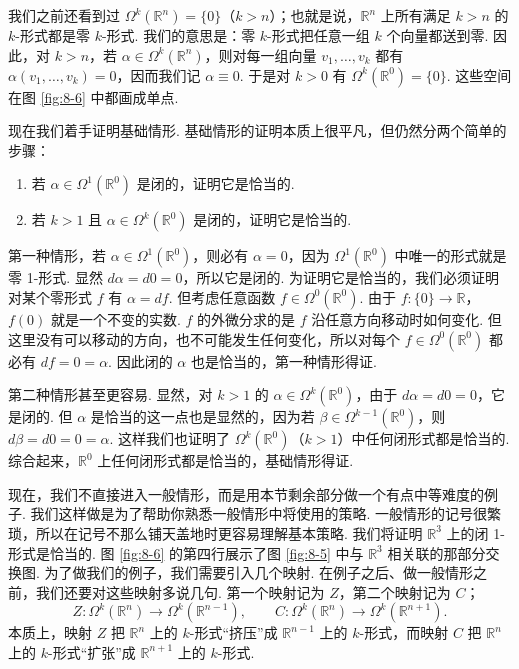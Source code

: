 我们之前还看到过 $\Omega^k(\mathbb{R}^n)=\{0\}$（$k>n$）；也就是说，$\mathbb{R}^n$ 上所有满足 $k>n$ 的 $k$-形式都是零 $k$-形式. 我们的意思是：零 $k$-形式把任意一组 $k$ 个向量都送到零. 因此，对 $k>n$，若 $\alpha\in\Omega^k(\mathbb{R}^n)$，则对每一组向量 $v_1,\ldots,v_k$ 都有 $\alpha(v_1,\ldots,v_k)=0$，因而我们记 $\alpha\equiv0$. 于是对 $k>0$ 有 $\Omega^k(\mathbb{R}^0)=\{0\}$. 这些空间在图 \ref{fig:8-6} 中都画成单点.

现在我们着手证明基础情形. 基础情形的证明本质上很平凡，但仍然分两个简单的步骤：
\begin{enumerate}
  \item 若 $\alpha\in\Omega^1(\mathbb{R}^0)$ 是闭的，证明它是恰当的.
  \item 若 $k>1$ 且 $\alpha\in\Omega^k(\mathbb{R}^0)$ 是闭的，证明它是恰当的.
\end{enumerate}

第一种情形，若 $\alpha\in\Omega^1(\mathbb{R}^0)$，则必有 $\alpha=0$，因为 $\Omega^1(\mathbb{R}^0)$ 中唯一的形式就是零 1-形式. 显然 $d\alpha=d0=0$，所以它是闭的. 为证明它是恰当的，我们必须证明对某个零形式 $f$ 有 $\alpha=df$. 但考虑任意函数 $f\in\Omega^0(\mathbb{R}^0)$. 由于 $f:\{0\}\to\mathbb{R}$，$f(0)$ 就是一个不变的实数. $f$ 的外微分求的是 $f$ 沿任意方向移动时如何变化. 但这里没有可以移动的方向，也不可能发生任何变化，所以对每个 $f\in\Omega^0(\mathbb{R}^0)$ 都必有 $df=0=\alpha$. 因此闭的 $\alpha$ 也是恰当的，第一种情形得证.

第二种情形甚至更容易. 显然，对 $k>1$ 的 $\alpha\in\Omega^k(\mathbb{R}^0)$，由于 $d\alpha=d0=0$，它是闭的. 但 $\alpha$ 是恰当的这一点也是显然的，因为若 $\beta\in\Omega^{k-1}(\mathbb{R}^0)$，则 $d\beta=d0=0=\alpha$. 这样我们也证明了 $\Omega^k(\mathbb{R}^0)$（$k>1$）中任何闭形式都是恰当的. 综合起来，$\mathbb{R}^0$ 上任何闭形式都是恰当的，基础情形得证.

现在，我们不直接进入一般情形，而是用本节剩余部分做一个有点中等难度的例子. 我们这样做是为了帮助你熟悉一般情形中将使用的策略. 一般情形的记号很繁琐，所以在记号不那么铺天盖地时更容易理解基本策略. 我们将证明 $\mathbb{R}^3$ 上的闭 1-形式是恰当的. 图 \ref{fig:8-6} 的第四行展示了图 \ref{fig:8-5} 中与 $\mathbb{R}^3$ 相关联的那部分交换图. 为了做我们的例子，我们需要引入几个映射. 在例子之后、做一般情形之前，我们还要对这些映射多说几句. 第一个映射记为 $Z$，第二个映射记为 $C$；
\[
Z:\Omega^k(\mathbb{R}^n)\to\Omega^k(\mathbb{R}^{n-1}),\qquad
C:\Omega^k(\mathbb{R}^n)\to\Omega^k(\mathbb{R}^{n+1}).
\]
本质上，映射 $Z$ 把 $\mathbb{R}^n$ 上的 $k$-形式``挤压''成 $\mathbb{R}^{n-1}$ 上的 $k$-形式，而映射 $C$ 把 $\mathbb{R}^n$ 上的 $k$-形式``扩张''成 $\mathbb{R}^{n+1}$ 上的 $k$-形式.

